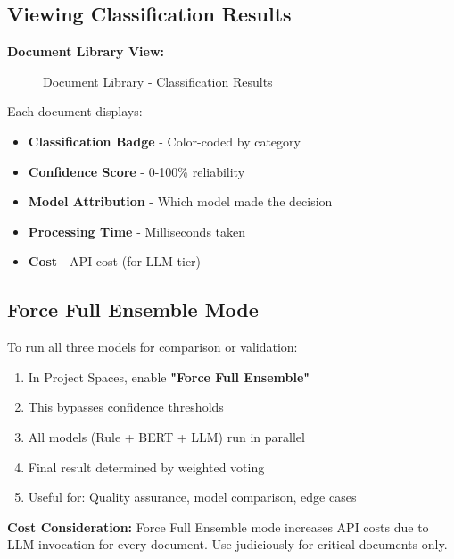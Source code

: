 \subsection{Viewing Classification Results}

\textbf{Document Library View:}

\begin{figure}[h]
\centering
{}
\caption{Document Library - Classification Results}
\label{fig:doc-library}
\end{figure}

Each document displays:
\begin{itemize}
    \item \textbf{Classification Badge} - Color-coded by category
    \item \textbf{Confidence Score} - 0-100\% reliability
    \item \textbf{Model Attribution} - Which model made the decision
    \item \textbf{Processing Time} - Milliseconds taken
    \item \textbf{Cost} - API cost (for LLM tier)
\end{itemize}

\subsection{Force Full Ensemble Mode}

To run all three models for comparison or validation:

\begin{enumerate}
    \item In Project Spaces, enable \textbf{"Force Full Ensemble"}
    \item This bypasses confidence thresholds
    \item All models (Rule + BERT + LLM) run in parallel
    \item Final result determined by weighted voting
    \item Useful for: Quality assurance, model comparison, edge cases
\end{enumerate}

\begin{infobox}
\textbf{Cost Consideration:} Force Full Ensemble mode increases API costs due to LLM invocation for every document. Use judiciously for critical documents only.
\end{infobox}

